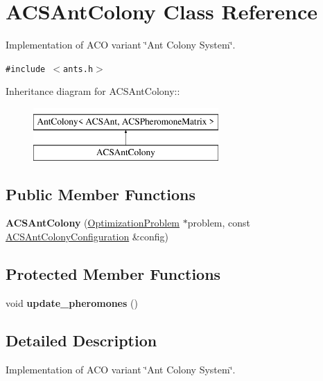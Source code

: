 \hypertarget{classACSAntColony}{
\section{ACSAntColony Class Reference}
\label{classACSAntColony}
}
Implementation of ACO variant \char`\"{}Ant Colony System\char`\"{}.  


{\tt \#include $<$ants.h$>$}

Inheritance diagram for ACSAntColony::\begin{figure}[H]
\begin{center}
\leavevmode
\includegraphics[height=2cm]{classACSAntColony}
\end{center}
\end{figure}
\subsection*{Public Member Functions}
\begin{CompactItemize}
\item 
\hypertarget{classACSAntColony_3798006ef5648f6275a20fe5e75aceef}{
\textbf{ACSAntColony} (\hyperlink{classOptimizationProblem}{OptimizationProblem} $\ast$problem, const \hyperlink{classACSAntColonyConfiguration}{ACSAntColonyConfiguration} \&config)}
\label{classACSAntColony_3798006ef5648f6275a20fe5e75aceef}

\end{CompactItemize}
\subsection*{Protected Member Functions}
\begin{CompactItemize}
\item 
\hypertarget{classACSAntColony_9e67aae971c5ba02a8a47797a079da06}{
void \textbf{update\_\-pheromones} ()}
\label{classACSAntColony_9e67aae971c5ba02a8a47797a079da06}

\end{CompactItemize}


\subsection{Detailed Description}
Implementation of ACO variant \char`\"{}Ant Colony System\char`\"{}. 

